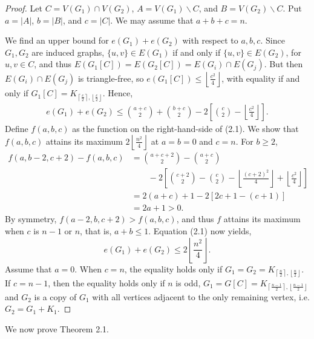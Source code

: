 \documentclass[12pt]{report}
\begin{document}
\begin{proof}
  Let $C = V(G_1) \cap V(G_2)$, $A = V(G_1) \backslash C$, and $B = V(G_2) \backslash C$. Put $a =
  |A|$, $b = |B|$, and $c = |C|$. We may assume that $a + b + c = n$.

  We find an upper bound for $e(G_1) + e(G_2)$ with respect to $a, b, c$. Since $G_1, G_2$ are
  induced graphs, $\{u, v\} \in E(G_1)$ if and only if $\{u, v\} \in E(G_2)$, for $u, v \in C$, and
  thus $E(G_1[C]) = E(G_2[C]) = E(G_i) \cap E(G_j)$. But then $E(G_i) \cap E(G_j)$ is triangle-free,
  so $e(G_1[C]) \leq \left\lfloor\frac{c^2}{4}\right\rfloor$, with equality if and only if $G_1[C] =
  K_{\left\lceil\frac{c}{2}\right\rceil, \left\lfloor\frac{c}{2}\right\rfloor}$. Hence, 
  \begin{gather}
    e(G_1) + e(G_2) \leq \binom{a + c}{2} + \binom{b + c}{2} - 2\left[\binom{c}{2} - \left\lfloor\frac{c^2}{4}\right\rfloor\right].
  \end{gather}
  Define $f(a, b, c)$ as the function on the right-hand-side of (2.1). We show that $f(a, b, c)$
  attains its maximum $2\left\lfloor\frac{n^2}{4}\right\rfloor$ at $a = b = 0$ and $c = n$. For $b
  \geq 2$,
  \begin{align*}
    f(a, b - 2, c + 2) - f(a, b, c)
    &= \binom{a + c + 2}{2} - \binom{a + c}{2} \\
    &\qquad - 2\left[\binom{c + 2}{2} - \binom{c}{2} - \left\lfloor\frac{(c + 2)^2}{4}\right\rfloor + \left\lfloor\frac{c^2}{4}\right\rfloor\right] \\
    &= 2(a + c) + 1 - 2[2c + 1 - (c + 1)] \\
    &= 2a + 1 > 0.
  \end{align*}
  By symmetry, $f(a - 2, b, c + 2) > f(a, b, c)$, and thus $f$ attains its maximum when $c$ is $n -
  1$ or $n$, that is, $a + b \leq 1$. Equation (2.1) now yields, 
  \[
    e(G_1) + e(G_2) \leq 2\left\lfloor\frac{n^2}{4}\right\rfloor.
  \]
  Assume that $a = 0$. When $c = n$, the equality holds only if $G_1 = G_2 =
  K_{\left\lceil\frac{n}{2}\right\rceil, \left\lfloor\frac{n}{2}\right\rfloor}$. If $c = n - 1$,
  then the equality holds only if $n$ is odd, $G_1 = G[C] = K_{\left\lceil\frac{n -
  1}{2}\right\rceil, \left\lfloor\frac{n - 1}{2}\right\rfloor}$ and $G_2$ is a copy of $G_1$ with
  all vertices adjacent to the only remaining vertex, i.e. $G_2 = G_1 + K_1$.
\end{proof}

We now prove Theorem 2.1.
\end{document}
